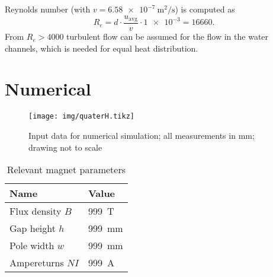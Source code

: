 \documentclass[10pt,a4paper,noendnumber=true]{scrartcl}
\begin{document}
Reynolds number (with $v=\SI{6.58e-7}{\meter\squared\per\second}$) is computed as
\begin{equation}
    R_e = d \cdot \frac{u_\text{avg}}{v} \cdot \num{1e-3} = \num{16660}.
\end{equation}
From $R_e>4000$ turbulent flow can be assumed for the flow in the water channels, which is needed for equal heat distribution.



\newpage
\section{Numerical}

\begin{figure}[H]
\centering
\texttt{[image: img/quaterH.tikz]}
\caption{Input data for numerical simulation; all measurements in \si{\mm}; drawing not to scale}
\end{figure}

\begin{table}[H]
\centering
\caption{Relevant magnet parameters}
\begin{tabular}{ll}
\toprule
Name & Value \\
\midrule
Flux density $B$ & \SI{999}{\tesla}\\
Gap height $h$ & \SI{999}{\mm}\\
Pole width $w$ & \SI{999}{\mm}\\
Ampereturns $NI$ & \SI{999}{\ampere}\\
\bottomrule
\end{tabular}
\end{table}
\end{document}
